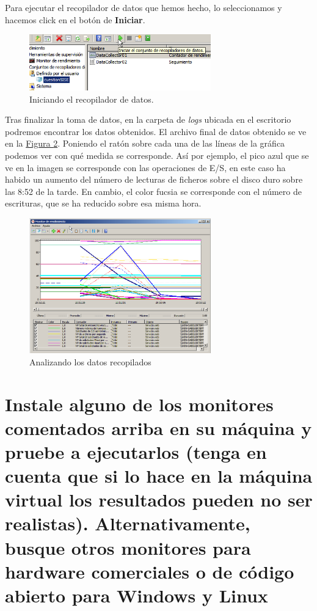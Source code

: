 \documentclass[10pt,a4paper,spanish]{article}
\numberwithin{equation}{section} %
\numberwithin{figure}{section} %
\numberwithin{table}{section} %
\begin{document}
Para ejecutar el recopilador de datos que hemos hecho, lo seleccionamos y hacemos click en el botón de \textbf{Iniciar}.

\begin{figure}
    \centering
    \includegraphics[width=0.7\textwidth]{47}
    \caption{Iniciando el recopilador de datos.}
    \label{startrecopi}
\end{figure} 

Tras finalizar la toma de datos, en la carpeta de \textit{logs} ubicada en el escritorio podremos encontrar los datos obtenidos. El archivo final de datos obtenido se ve en la \hyperref[dataanalisis]{Figura \ref*{dataanalisis}}. Poniendo el ratón sobre cada una de las líneas de la gráfica podemos ver con qué medida se corresponde. Así por ejemplo, el pico azul que se ve en la imagen se corresponde con las operaciones de E/S, en este caso ha habido un aumento del número de lecturas de ficheros sobre el disco duro sobre las 8:52 de la tarde. En cambio, el color fucsia se corresponde con el número de escrituras, que se ha reducido sobre esa misma hora.

\begin{figure}
    \centering
    \includegraphics[width=0.7\textwidth]{49}
    \caption{Analizando los datos recopilados}
    \label{dataanalisis}
\end{figure} 

\section{Instale alguno de los monitores comentados arriba en su máquina y pruebe a ejecutarlos (tenga en cuenta que si lo hace en la máquina virtual los resultados pueden no ser realistas). Alternativamente, busque otros monitores para hardware comerciales o de código abierto para Windows y Linux}
\end{document}
